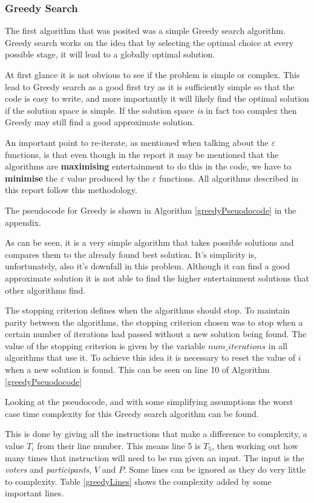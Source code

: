 \documentclass[12pt]{report}
\begin{document}
\subsubsection{Greedy Search}
The first algorithm that was posited was a simple Greedy search algorithm. Greedy search works on the idea that by selecting the optimal choice at every possible stage, it will lead to a globally optimal solution.\cite{GreedySearch}

At first glance it is not obvious to see if the problem is simple or complex. This lead to Greedy search as a good first try as it is sufficiently simple so that the code is easy to write, and more importantly it will likely find the optimal solution if the solution space is simple. If the solution space \textit{is} in fact too complex then Greedy may still find a good approximate solution.

An important point to re-iterate, as mentioned when talking about the $\varepsilon$ functions, is that even though in the report it may be mentioned that the algorithms are \textbf{maximising} entertainment to do this in the code, we have to \textbf{minimise} the $\varepsilon$ value produced by the $\varepsilon$ functions. All algorithms described in this report follow this methodology.

The pseudocode for Greedy is shown in Algorithm \ref{greedyPseuodocode} in the appendix.

As can be seen, it is a very simple algorithm that takes possible solutions and compares them to the already found best solution. It's simplicity is, unfortunately, also it's downfall in this problem. Although it can find a good approximate solution it is not able to find the higher entertainment solutions that other algorithms find.

The stopping criterion defines when the algorithms should stop. To maintain parity between the algorithms, the stopping criterion chosen was to stop when a certain number of iterations had passed without a new solution being found. The value of the stopping criterion is given by the variable $num\_iterations$ in all algorithms that use it. To achieve this idea it is necessary to reset the value of $i$ when a new solution is found. This can be seen on line 10 of Algorithm \ref{greedyPseuodocode}

Looking at the pseudocode, and with some simplifying assumptions the worst case time complexity for this Greedy search algorithm can be found.

This is done by giving all the instructions that make a difference to complexity, a value $T_i$ from their line number. This means line 5 is $T_5$, then working out how many times that instruction will need to be run given an input. The input is the \textit{voters} and \textit{participants}, $V$ and $P$. Some lines can be ignored as they do very little to complexity. Table \ref{greedyLines} shows the complexity added by some important lines.
\end{document}
